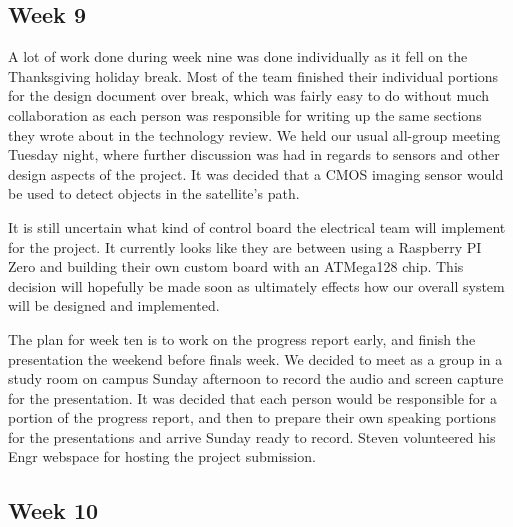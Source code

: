 \documentclass[10pt,letterpaper,onecolumn,draftclsnofoot,journal]{IEEEtran}
\begin{document}
\subsection{Week 9}
\par
A lot of work done during week nine was done individually as it fell on the Thanksgiving holiday break. Most of the team finished their individual portions for the design document over break, which was fairly easy to do without much collaboration as each person was responsible for writing up the same sections they wrote about in the technology review. We held our usual all-group meeting Tuesday night, where further discussion was had in regards to sensors and other design aspects of the project. It was decided that a CMOS imaging sensor would be used to detect objects in the satellite's path.
\par
It is still uncertain what kind of control board the electrical team will implement for the project. It currently looks like they are between using a Raspberry PI Zero and building their own custom board with an ATMega128 chip. This decision will hopefully be made soon as ultimately effects how our overall system will be designed and implemented.
\par
The plan for week ten is to work on the progress report early, and finish the presentation the weekend before finals week. We decided to meet as a group in a study room on campus Sunday afternoon to record the audio and screen capture for the presentation. It was decided that each person would be responsible for a portion of the progress report, and then to prepare their own speaking portions for the presentations and arrive Sunday ready to record. Steven volunteered his Engr webspace for hosting the project submission.

\subsection{Week 10}
\end{document}

